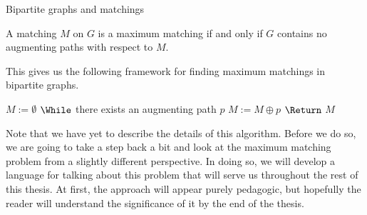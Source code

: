 \documentclass[11pt]{article}
\renewcommand{\'}{^{'}}
\renewcommand{\gets}{:=}
\newenvironment{theorem}[2][Theorem]{\begin{trivlist}
\item[\hskip \labelsep {\bfseries #1}\hskip \labelsep {\bfseries #2.}]}{\end{trivlist}}
\begin{document}
\begin{section}{Bipartite graphs and matchings}
	\begin{theorem}{(Berge, 1957)}
		A matching $M$ on $G$ is a maximum matching if and only if $G$ contains no augmenting 
		paths with respect to $M$.
	\end{theorem}

	This gives us the following framework for finding maximum matchings in bipartite graphs.

	\begin{codebox}
		\li $M \gets \emptyset $
		\li $\While$ there exists an augmenting path $p$
			\Do
		\li		$M \gets M\oplus p$
			\End
		\li $\Return$ $M$
	\end{codebox}

	Note that we have yet to describe the details of this algorithm. Before we do so, we are going 
	to take a step back a bit and look at the maximum matching problem from a slightly different 
	perspective. In doing so, we will develop a language for talking about this problem that will 
	serve us throughout the rest of this thesis. At first, the approach will appear purely 
	pedagogic, but hopefully the reader will understand the significance of it by the end of the 
	thesis.

\end{section}
\end{document}
